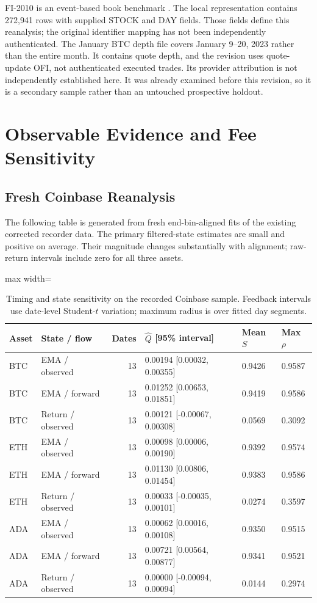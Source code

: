 \documentclass[12pt]{article}
\theoremstyle{definition}
\theoremstyle{remark}
\begin{document}
FI-2010 is an event-based book benchmark \citep{ntakaris2018benchmark}. The local representation contains 272,941 rows with supplied STOCK and DAY fields. Those fields define this reanalysis; the original identifier mapping has not been independently authenticated. The January BTC depth file covers January 9--20, 2023 rather than the entire month. It contains quote depth, and the revision uses quote-update OFI, not authenticated executed trades. Its provider attribution is not independently established here. It was already examined before this revision, so it is a secondary sample rather than an untouched prospective holdout.

\section{Observable Evidence and Fee Sensitivity}
\label{sec:baseline_natural_exp}
\subsection{Fresh Coinbase Reanalysis}
The following table is generated from fresh end-bin-aligned fits of the existing corrected recorder data. The primary filtered-state estimates are small and positive on average. Their magnitude changes substantially with alignment; raw-return intervals include zero for all three assets.

\begin{table}[htbp]
\centering\small
\caption{Timing and state sensitivity on the recorded Coinbase sample. Feedback intervals use date-level Student-$t$ variation; maximum radius is over fitted day segments.}
\label{tab:timing_revised}
\begin{adjustbox}{max width=\textwidth}
\begin{tabular}{llrlll}\toprule
Asset & State / flow & Dates & $\hat Q$ [95\% interval] & Mean $\hat S$ & Max $\rho$ \\\midrule
BTC & EMA / observed & 13 & 0.00194 [0.00032, 0.00355] & 0.9426 & 0.9587 \\
BTC & EMA / forward & 13 & 0.01252 [0.00653, 0.01851] & 0.9419 & 0.9586 \\
BTC & Return / observed & 13 & 0.00121 [-0.00067, 0.00308] & 0.0569 & 0.3092 \\
ETH & EMA / observed & 13 & 0.00098 [0.00006, 0.00190] & 0.9392 & 0.9574 \\
ETH & EMA / forward & 13 & 0.01130 [0.00806, 0.01454] & 0.9383 & 0.9586 \\
ETH & Return / observed & 13 & 0.00033 [-0.00035, 0.00101] & 0.0274 & 0.3597 \\
ADA & EMA / observed & 13 & 0.00062 [0.00016, 0.00108] & 0.9350 & 0.9515 \\
ADA & EMA / forward & 13 & 0.00721 [0.00564, 0.00877] & 0.9341 & 0.9521 \\
ADA & Return / observed & 13 & 0.00000 [-0.00094, 0.00094] & 0.0144 & 0.2974 \\
\bottomrule\end{tabular}
\end{adjustbox}
\end{table}
\end{document}
